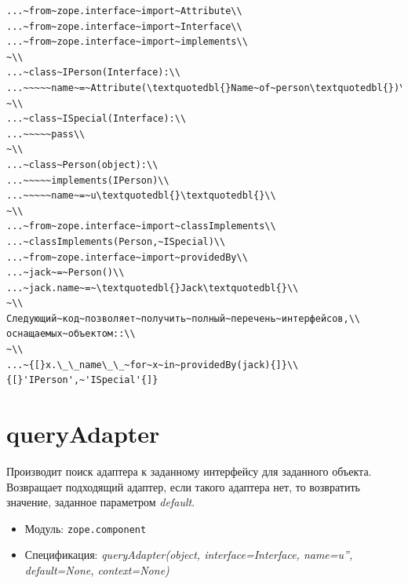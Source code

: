 \documentclass[a4paper,openany,twoside,draft]{book}
\providecommand*{\DUroletitlereference}[1]{\textsl{#1}}
\begin{document}
\begin{verbatim}
...~from~zope.interface~import~Attribute\\
...~from~zope.interface~import~Interface\\
...~from~zope.interface~import~implements\\
~\\
...~class~IPerson(Interface):\\
...~~~~~name~=~Attribute(\textquotedbl{}Name~of~person\textquotedbl{})\\
~\\
...~class~ISpecial(Interface):\\
...~~~~~pass\\
~\\
...~class~Person(object):\\
...~~~~~implements(IPerson)\\
...~~~~~name~=~u\textquotedbl{}\textquotedbl{}\\
~\\
...~from~zope.interface~import~classImplements\\
...~classImplements(Person,~ISpecial)\\
...~from~zope.interface~import~providedBy\\
...~jack~=~Person()\\
...~jack.name~=~\textquotedbl{}Jack\textquotedbl{}\\
~\\
Следующий~код~позволяет~получить~полный~перечень~интерфейсов,\\
оснащаемых~объектом::\\
~\\
...~{[}x.\_\_name\_\_~for~x~in~providedBy(jack){]}\\
{[}'IPerson',~'ISpecial'{]}
\end{verbatim}


\section*{queryAdapter%
  \label{queryadapter}%
}

Производит поиск адаптера к заданному интерфейсу для заданного
объекта.  Возвращает подходящий адаптер, если такого адаптера нет, то
возвратить значение, заданное параметром \DUroletitlereference{default}.

\begin{itemize}

\item Модуль: \texttt{zope.component}

\item Спецификация: \DUroletitlereference{queryAdapter(object, interface=Interface, name=u'',
default=None, context=None)}

\end{itemize}
\end{document}

